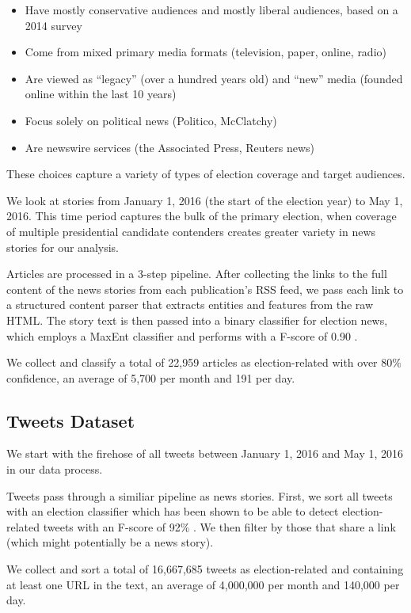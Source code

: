 \documentclass[letterpaper]{article}
\begin{document}
\begin{itemize}
\item Have mostly conservative audiences and mostly liberal audiences, based on a 2014 survey \cite{PoliticalPolarization}
\item Come from mixed primary media formats (television, paper, online, radio)
\item Are viewed as ``legacy'' (over a hundred years old) and ``new'' media (founded online within the last 10 years)
\item Focus solely on political news (Politico, McClatchy)
\item Are newswire services (the Associated Press, Reuters news)
\end{itemize}
 
These choices capture a variety of types of election coverage and target audiences.
 
 We look at stories from January 1, 2016 (the start of the election year) to May 1, 2016. This time period captures the bulk of the primary election, when coverage of multiple presidential candidate contenders creates greater variety in news stories for our analysis.

Articles are processed in a 3-step pipeline. After collecting the links to the full content of the news stories from each publication's RSS feed, we pass each link to a structured content parser that extracts entities and features from the raw HTML. The story text is then passed into a binary classifier for election news, which employs a MaxEnt classifier and performs with a F-score of 0.90 \cite{vijayaraghavan-thesis}. 

 We collect and classify a total of 22,959 articles as election-related with over 80\% confidence, an average of 5,700 per month and 191 per day.


\subsection{Tweets Dataset}
We start with the firehose of all tweets between January 1, 2016 and May 1, 2016 in our data process. 

Tweets pass through a similiar pipeline as news stories. First, we sort all tweets with an election classifier which has been shown to be able to detect election-related tweets with an F-score of 92\% \cite{vvr_electome2016}. We then filter by those that share a link (which might potentially be a news story). 

We collect and sort a total of 16,667,685 tweets as election-related and containing at least one URL in the text, an average of 4,000,000 per month and 140,000 per day.
\end{document}
